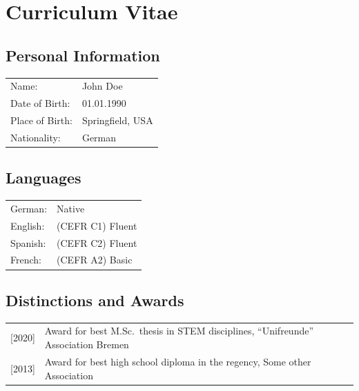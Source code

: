 \chapter{Curriculum Vitae}
    \section*{Personal Information}
        \begin{tabular}{ll}
        Name: & John Doe \\
        Date of Birth: & 01.01.1990 \\
        Place of Birth: & Springfield, USA \\
        Nationality: & German \\
        \end{tabular}
    \section*{Languages}
    \begin{tabular}{ll}
        German: & Native \\
        
        English: & (CEFR C1) Fluent \\
        
        Spanish: & (CEFR C2) Fluent \\
        
        French: & (CEFR A2) Basic \\
    \end{tabular}

    \section*{Distinctions and Awards}
        \begin{tabular}{lp{10cm}}
        [2020] & Award for best M.Sc.~thesis in STEM disciplines, ``Unifreunde'' Association Bremen \\
                
        [2013] & Award for best high school diploma in the regency, Some other Association \\
        
        \end{tabular}
     \vspace*{\fill}
    
